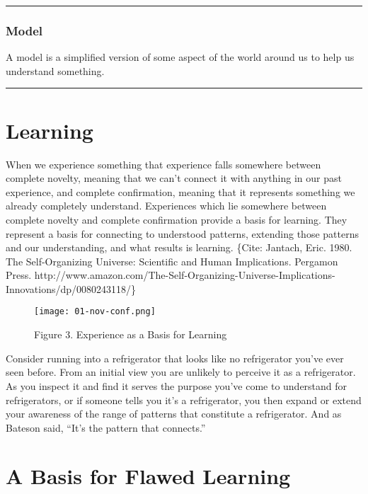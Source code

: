 \documentclass[]{memoir}
\makeatletter
\def\maxwidth{\ifdim\Gin@nat@width>\linewidth\linewidth
\else\Gin@nat@width\fi}
\let\Oldincludegraphics\includegraphics
\renewcommand{\includegraphics}[1]{\Oldincludegraphics[width=\maxwidth]{#1}}
\makeatother
\begin{document}
\begin{center}\rule{3in}{0.4pt}\end{center}

\subsubsection{Model}

A model is a simplified version of some aspect of the world around us to
help us understand something.

\begin{center}\rule{3in}{0.4pt}\end{center}

\section{Learning}

When we experience something that experience falls somewhere between
complete novelty, meaning that we can't connect it with anything in our
past experience, and complete confirmation, meaning that it represents
something we already completely understand. Experiences which lie
somewhere between complete novelty and complete confirmation provide a
basis for learning. They represent a basis for connecting to understood
patterns, extending those patterns and our understanding, and what
results is learning. \{Cite: Jantach, Eric. 1980. The Self-Organizing
Universe: Scientific and Human Implications. Pergamon Press.
http://www.amazon.com/The-Self-Organizing-Universe-Implications-Innovations/dp/0080243118/\}

\begin{figure}[htbp]
\centering
\texttt{[image: 01-nov-conf.png]}
\caption{Figure 3. Experience as a Basis for Learning}
\end{figure}

Consider running into a refrigerator that looks like no refrigerator
you've ever seen before. From an initial view you are unlikely to
perceive it as a refrigerator. As you inspect it and find it serves the
purpose you've come to understand for refrigerators, or if someone tells
you it's a refrigerator, you then expand or extend your awareness of the
range of patterns that constitute a refrigerator. And as Bateson said,
``It's the pattern that connects.''

\section{A Basis for Flawed Learning}
\end{document}
